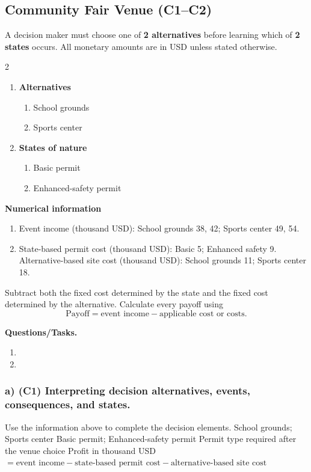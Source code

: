 \subsection{Community Fair Venue (C1--C2)}
\label{sec:problem11-community-fair-venue-c1-c2}
A decision maker must choose one of \textbf{2 alternatives} before learning which of \textbf{2 states} occurs. All monetary amounts are in USD unless stated otherwise.
\begin{multicols}{2}
\begin{enumerate}[label=\arabic*.]
 \item \textbf{Alternatives}
 \begin{enumerate}[label=\roman*)]
  \item School grounds
  \item Sports center
 \end{enumerate}
 \item \textbf{States of nature}
 \begin{enumerate}[label=\roman*)]
  \item Basic permit
  \item Enhanced-safety permit
 \end{enumerate}
\end{enumerate}
\end{multicols}
 \textbf{Numerical information}
 \begin{enumerate}[label=\roman*)]
  \item Event income (thousand USD): School grounds 38, 42; Sports center 49, 54.
  \item State-based permit cost (thousand USD): Basic 5; Enhanced safety 9. Alternative-based site cost (thousand USD): School grounds 11; Sports center 18.
 \end{enumerate}
Subtract both the fixed cost determined by the state and the fixed cost determined by the alternative. Calculate every payoff using
\[
 \text{Payoff}=\text{event income}-\text{applicable cost or costs}.
\]

\textbf{Questions/Tasks.}
\begin{enumerate}[label=\textbf{\alph*)}]
 \item {}
 \item {}
\end{enumerate}
\subsubsection*{a) \textbf{(C1)} Interpreting decision alternatives, events, consequences, and states.}
\label{subsec:problem11-community-fair-venue-c1}
Use the information above to complete the decision elements.
\DecisionElementsTable
{School grounds; Sports center}
{Basic permit; Enhanced-safety permit}
{Permit type required after the venue choice}
{Profit in thousand USD $= \text{event income} - \text{state-based permit cost} - \text{alternative-based site cost}$}
